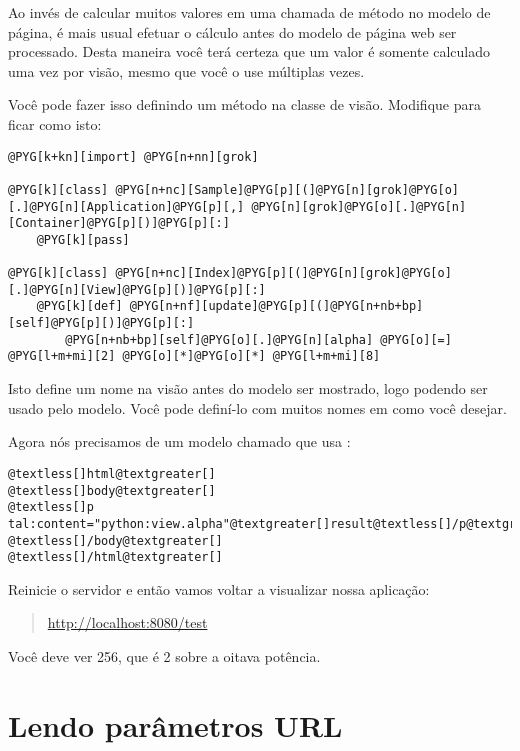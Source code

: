 \documentclass[a4paper,12pt,portuguese]{manual}
\begin{document}
Ao invés de calcular muitos valores em uma chamada de método no
modelo de página, é mais usual efetuar o cálculo antes do modelo de página web ser
processado. Desta maneira você terá certeza que um valor é somente
calculado uma vez por visão, mesmo que você o use múltiplas
vezes.

Você pode fazer isso definindo um método  na classe de
visão. Modifique  para ficar como isto:

\begin{Verbatim}[commandchars=@\[\]]
@PYG[k+kn][import] @PYG[n+nn][grok]

@PYG[k][class] @PYG[n+nc][Sample]@PYG[p][(]@PYG[n][grok]@PYG[o][.]@PYG[n][Application]@PYG[p][,] @PYG[n][grok]@PYG[o][.]@PYG[n][Container]@PYG[p][)]@PYG[p][:]
    @PYG[k][pass]

@PYG[k][class] @PYG[n+nc][Index]@PYG[p][(]@PYG[n][grok]@PYG[o][.]@PYG[n][View]@PYG[p][)]@PYG[p][:]
    @PYG[k][def] @PYG[n+nf][update]@PYG[p][(]@PYG[n+nb+bp][self]@PYG[p][)]@PYG[p][:]
        @PYG[n+nb+bp][self]@PYG[o][.]@PYG[n][alpha] @PYG[o][=] @PYG[l+m+mi][2] @PYG[o][*]@PYG[o][*] @PYG[l+m+mi][8]
\end{Verbatim}

Isto define um nome  na visão antes do modelo ser
mostrado, logo podendo ser usado pelo modelo. Você pode definí-lo com
muitos nomes em  como você desejar.

Agora nós precisamos de um modelo chamado  que usa :

\begin{Verbatim}[commandchars=@\[\]]
@textless[]html@textgreater[]
@textless[]body@textgreater[]
@textless[]p tal:content="python:view.alpha"@textgreater[]result@textless[]/p@textgreater[]
@textless[]/body@textgreater[]
@textless[]/html@textgreater[]
\end{Verbatim}

Reinicie o servidor e então vamos voltar a visualizar nossa aplicação:
\begin{quote}

\href{http://localhost:8080/test}{http://localhost:8080/test}
\end{quote}

Você deve ver 256, que é 2 sobre a oitava potência.


\section{Lendo parâmetros URL}
\end{document}
